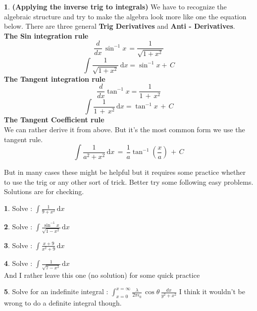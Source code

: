 \documentclass[10pt,letterpaper,twocolumn]{article}
\theoremstyle{definition}
\newtheorem{fct}{\framebox[0.07\textwidth]{{\sffamily Fact}}}[section]
\theoremstyle{definition}
\newtheorem{pr}{\framebox[0.07\textwidth]{Pr}}[section]
\theoremstyle{definition}
\begin{document}
\begin{fct} \textbf{(Applying the inverse trig to integrals)}
We have to recognize the algebraic structure and try to make the algebra look more like one the equation below. There are three general \textbf{Trig Derivatives} and \textbf{Anti - Derivatives}.\\
\textbf{\textsf{The Sin integration rule}}
\begin{equation}
\frac{d}{dx} \, \sin^{-1} x \, = \frac{1}{\sqrt{1 + x^2}}
\end{equation}
\[
\int  \frac{1}{\sqrt{1 + x^2}}\, \mathrm{d}x = \sin ^{-1}x + \, C
\] 
\textbf{\textsf{The Tangent integration rule}}
\begin{equation}
\frac{d}{dx} \tan ^{-1}x = \frac{1}{1 \, + \, x^2}
\end{equation} 
\[\int \frac{1}{1 \, + \, x^2} \, \mathrm{d}x = \tan ^{-1}x \, + \, C\]
\textbf{\textsf{The Tangent Coefficient rule}} \\
We can rather derive it from above. But it's the most common form we use the tangent rule.
\[\int \frac{1}{a^2 + x^2} \, \mathrm{d}x \,=\, \frac{1}{a} \tan ^{-1} (\frac{x}{a}) \,+\, C
\]
\end{fct}
But in many cases these might be helpful but it requires some practice whether to use the trig or any other sort of trick. Better try some following easy problems. Solutions are for checking.
\begin{pr}
Solve : $ \int \frac{1}{9+x^2} \, \mathrm{d}x$
\end{pr}

\begin{pr}
Solve : $ \int \frac{\sin ^{-1}x}{\sqrt{1 - x^2}} \, \mathrm{d} x $
\end{pr}

\begin{pr}
Solve : $ \int \frac{x+9}
								{x^{2} + 9} \, \mathrm{d}x $
\end{pr}

\begin{pr}
		Solve : $ \int \frac{1}
		{\sqrt{7 - x^{2}   }} \, \mathrm{d} x
		$\\
		And I rather leave this one (no solution) for some quick practice
		\end{pr}
		
		\begin{pr}
		Solve for an indefinite integral : $ \int_{x=0} ^{x=\infty}
			\frac{\lambda}
			{2 \pi \epsilon_0} \, \cos\theta \, \frac{dx}{y^2 + x^2} $
			I think it wouldn't be wrong to do a definite integral though.
			\end{pr}
\end{document}
